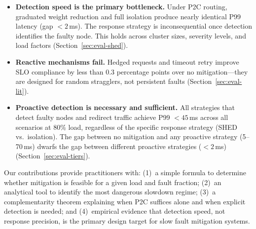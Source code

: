 \begin{itemize}
\item \textbf{Detection speed is the primary bottleneck.} Under P2C routing,
  graduated weight reduction and full isolation produce nearly identical
  P99 latency (gap $< 2$\,ms). The response strategy is inconsequential
  once detection identifies the faulty node. This holds across cluster
  sizes, severity levels, and load factors (Section~\ref{sec:eval-shed}).

\item \textbf{Reactive mechanisms fail.} Hedged requests and timeout retry
  improve SLO compliance by less than 0.3 percentage points over no
  mitigation---they are designed for random stragglers, not persistent
  faults (Section~\ref{sec:eval-lit}).

\item \textbf{Proactive detection is necessary and sufficient.} All
  strategies that detect faulty nodes and redirect traffic achieve P99
  $< 45$\,ms across all scenarios at 80\% load, regardless of the specific
  response strategy (SHED vs.\ isolation). The gap between no mitigation
  and any proactive strategy (5--70\,ms) dwarfs the gap between different
  proactive strategies ($< 2$\,ms) (Section~\ref{sec:eval-tiers}).
\end{itemize}

Our contributions provide practitioners with: (1)~a simple formula to
determine whether mitigation is feasible for a given load and fault
fraction; (2)~an analytical tool to identify the most dangerous slowdown
regime; (3)~a complementarity theorem explaining when P2C suffices alone
and when explicit detection is needed; and (4)~empirical evidence that
detection speed, not response precision, is the primary design target for
slow fault mitigation systems.
